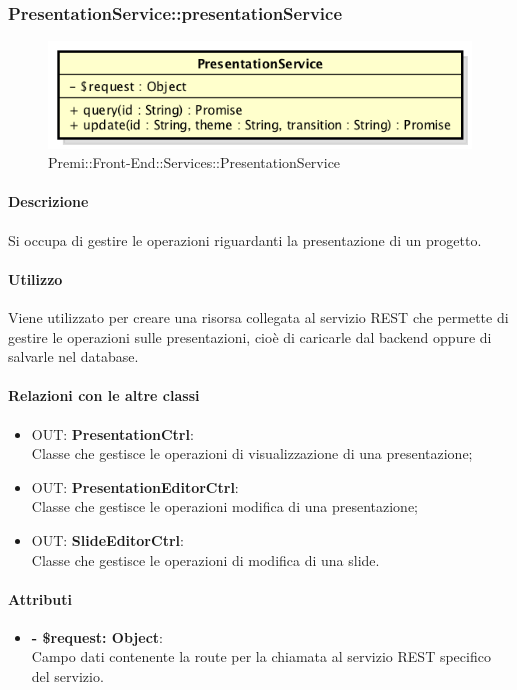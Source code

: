 		\subsubsection{PresentationService::presentationService}
		\begin{figure}[h]
			\centering
				\includegraphics[width=0.5\linewidth]{img/premi_front_end_services_presentationservice}
			\caption[Premi::Front-End::Services::PresentationService]{Premi::Front-End::Services::PresentationService}
		\end{figure}
		
		\paragraph{Descrizione}
		Si occupa di gestire le operazioni riguardanti la presentazione di un progetto.
		
		\paragraph{Utilizzo}
		Viene utilizzato per creare una risorsa collegata al servizio \gls{REST} che permette di gestire le operazioni sulle presentazioni, cioè di caricarle dal backend oppure di salvarle nel \gls{database}.
		
		\paragraph{Relazioni con le altre classi}
		\begin{itemize}
			\item OUT: \textbf{PresentationCtrl}:\\
			Classe che gestisce le operazioni di visualizzazione di una presentazione;
			\item OUT: \textbf{PresentationEditorCtrl}:\\
			Classe che gestisce le operazioni modifica di una presentazione;
			\item OUT: \textbf{SlideEditorCtrl}:\\
			Classe che gestisce le operazioni di modifica di una \gls{slide}.
		\end{itemize}
		
		\paragraph{Attributi}
		\begin{itemize}
			\item \textbf{- \$request: Object}:\\
			Campo dati contenente la route per la chiamata al servizio \gls{REST} specifico del servizio.
		\end{itemize}	
		
